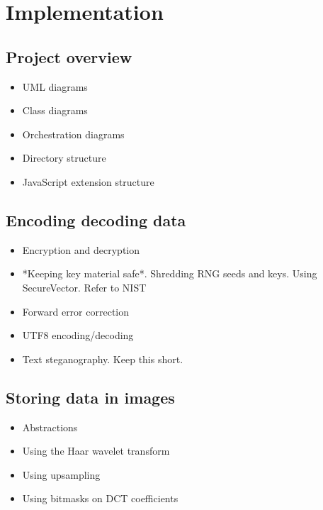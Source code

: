 \chapter{Implementation}\label{ch:implementation}

\section{Project overview}
    \begin{itemize}
        \item UML diagrams
        \item Class diagrams
        \item Orchestration diagrams
        \item Directory structure
        \item JavaScript extension structure
    \end{itemize}


\section{Encoding decoding data}
    \begin{itemize}
        \item Encryption and decryption
        \item *Keeping key material safe*. Shredding RNG seeds and keys. Using SecureVector. Refer to NIST
        \item Forward error correction
        \item UTF8 encoding/decoding
        \item Text steganography. Keep this short.
    \end{itemize}

\section{Storing data in images}
    \begin{itemize}
        \item Abstractions
        \item Using the Haar wavelet transform
        \item Using upsampling
        \item Using bitmasks on DCT coefficients
    \end{itemize}

